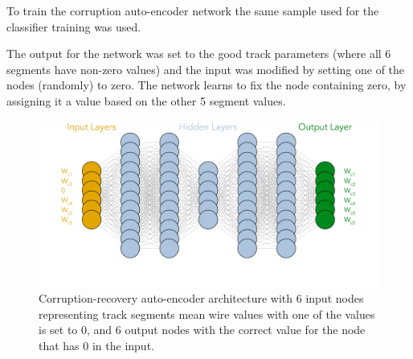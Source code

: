 To train the corruption auto-encoder network the same sample used for the classifier training was used.

 The output for the network was set to the good track parameters (where all 6 
segments have non-zero values) and the input was modified by setting one of the nodes (randomly) to zero. The network
learns to fix the node containing zero, by assigning it a value based on the other 5 segment values. 

 \begin{figure}[!ht]
\begin{center}
\includegraphics[width=4.5in]{images/aue_diagram.pdf}
\caption {Corruption-recovery auto-encoder architecture with 6 input nodes representing track segments mean wire values with one of the values is set to 0, and 6 output nodes with the correct value for the node that has 0 in the input. }
 \label{autoencoder:architecture}
 \end{center}
\end{figure}

